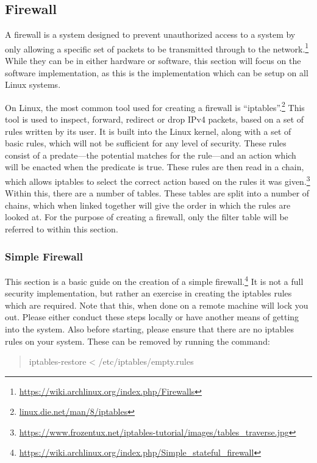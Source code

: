 \documentclass[a4paper,11pt]{report}
\begin{document}
				\subsection{Firewall} 
					A firewall is a system designed to prevent unauthorized access to a system by only allowing a specific set of packets to be transmitted through to the network.\footnote{\url{https://wiki.archlinux.org/index.php/Firewalls}}
					While they can be in either hardware or software, this section will focus on the software implementation, as this is the implementation which can be setup on all Linux systems. 

					On Linux, the most common tool used for creating a firewall is ``iptables''.\footnote{\url{linux.die.net/man/8/iptables}}
					This tool is used to inspect, forward, redirect or drop IPv4 packets, based on a set of rules written by its user. 
					It is built into the Linux kernel, along with a set of basic rules, which will not be sufficient for any level of security. 
					These rules consist of a predate---the potential matches for the rule---and an action which will be enacted when the predicate is true. 
					These rules are then read in a chain, which allows iptables to select the correct action based on the rules it was given.\footnote{\url{https://www.frozentux.net/iptables-tutorial/images/tables\_traverse.jpg}}
					Within this, there are a number of tables.
					These tables are split into a number of chains, which when linked together will give the order in which the rules are looked at. 
					For the purpose of creating a firewall, only the filter table will be referred to within this section. 
					
					\subsubsection{Simple Firewall}
						This section is a basic guide on the creation of a simple firewall.\footnote{\url{https://wiki.archlinux.org/index.php/Simple\_stateful\_firewall}}
						It is not a full security implementation, but rather an exercise in creating the iptables rules which are required. 
						Note that this, when done on a remote machine will lock you out. 
						Please either conduct these steps locally or have another means of getting into the system. 
						Also before starting, please ensure that there are no iptables rules on your system. 
						These can be removed by running the command:
						\begin{quote}
							iptables-restore < /etc/iptables/empty.rules
						\end{quote}
\end{document}
